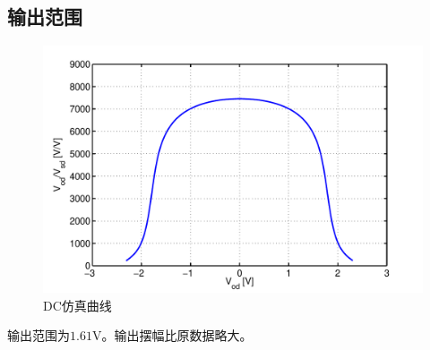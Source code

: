 \documentclass[a4paper]{article}
\newcommand{\uV}{\si{\volt}}
\begin{document}
\subsection{输出范围}
\begin{figure}[htb]
    \begin{center}
        \includegraphics[width=\textwidth]{fast/dc.pdf}
    \end{center}
    \caption{DC仿真曲线}
    \label{fastdc}
\end{figure}
输出范围为$1.61\uV$。输出摆幅比原数据略大。
\newpage
\clearpage
\end{document}
